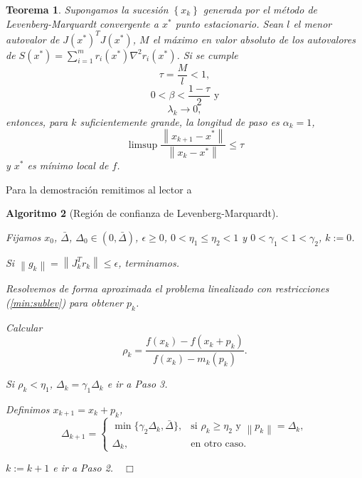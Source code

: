 \documentclass[11pt,a4paper]{book}
\newtheorem{theorem}{Teorema}[chapter]
\newtheorem{algorithm}[theorem]{Algoritmo}
\theoremstyle{definition}
\theoremstyle{remark}
\newcommand{\norm}[1]{\left\lVert#1\right\rVert}
\newcommand{\sucesionxk}{\left\{x_k\right\}}
\begin{document}
\begin{theorem}
Supongamos la sucesión $\sucesionxk$ generada por el método de Levenberg-Marquardt convergente a $x^*$ punto estacionario. Sean $l$ el menor autovalor de $J(x^*)^TJ(x^*)$, $M$ el máximo en valor absoluto de los autovalores de $S(x^*)=\sum_{i=1}^m r_i(x^*)\nabla^2r_i(x^*)$. Si se cumple
\begin{equation*}
\tau = \frac{M}{l} < 1,
\end{equation*}
\begin{equation*}
0<\beta<\frac{1-\tau}{2} \text{ y}
\end{equation*}
\begin{equation*}
\lambda_k \to 0,
\end{equation*}
entonces, para $k$ suficientemente grande, la longitud de paso es $\alpha_k=1$,
\begin{equation}
\limsup \frac{\norm{x_{k+1}-x^*}}{\norm{x_k-x^*}} \leq \tau
\end{equation}
y $x^*$ es mínimo local de $f$.
\end{theorem}
Para la demostración remitimos al lector a \cite[Teorema 7.3.8]{Sun2006-au}

\begin{algorithm}[Región de confianza de Levenberg-Marquardt] \leavevmode
	\label{al:tr-lm}
	\begin{steps}
		\item Fijamos $x_0$, $\bar{\Delta}$, $\Delta_0 \in (0, \bar{\Delta})$,
			$\epsilon \geq 0$, $0<\eta_1 \leq \eta_2<1$ y $0<\gamma_1<1<\gamma_2$, $k:=0$. 
		\item Si $\norm{g_k} = \norm{J_k^Tr_k} \leq \epsilon$, terminamos.
		\item Resolvemos de forma aproximada el problema linealizado
			con restricciones (\ref{min:sublev}) para obtener $p_k$.
		\item Calcular
			\begin{equation*}
				\rho_k = \frac{f(x_k)-f(x_k+p_k)}{f(x_k)-m_k(p_k)}.
			\end{equation*}
		\item Si $\rho_k < \eta_1$, $\Delta_{k} = \gamma_1\Delta_k$ e ir a Paso 3.
		\item Definimos $x_{k+1} = x_k + p_k$,
			\begin{equation*}
				\Delta_{k+1} = 
				\begin{cases}
					\min \{ \gamma_2\Delta_k, \bar{\Delta}\},& \text{si } \rho_k \geq \eta_2 \text{ y } \norm{p_k}=\Delta_k,\\
					\Delta_k, & \text{en otro caso.}
				\end{cases}
			\end{equation*}
		\item $k:=k+1$ e ir a Paso 2.$\quad \Box$
	\end{steps}
\end{algorithm}
\end{document}
